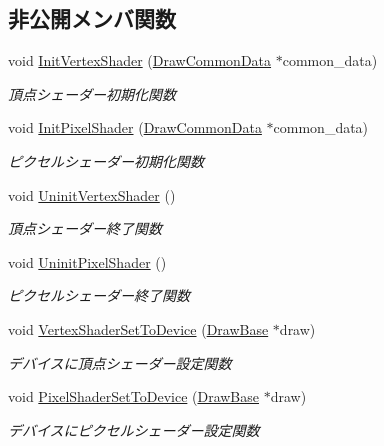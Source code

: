 \subsection*{非公開メンバ関数}
\begin{DoxyCompactItemize}
\item 
void \mbox{\hyperlink{class_shader_manager_a5bd660c22b7371684e2da37f0804b5ab}{Init\+Vertex\+Shader}} (\mbox{\hyperlink{class_draw_common_data}{Draw\+Common\+Data}} $\ast$common\+\_\+data)
\begin{DoxyCompactList}\small\item\em 頂点シェーダー初期化関数 \end{DoxyCompactList}\item 
void \mbox{\hyperlink{class_shader_manager_ada9ec9598240ca169bbcbd7231714e27}{Init\+Pixel\+Shader}} (\mbox{\hyperlink{class_draw_common_data}{Draw\+Common\+Data}} $\ast$common\+\_\+data)
\begin{DoxyCompactList}\small\item\em ピクセルシェーダー初期化関数 \end{DoxyCompactList}\item 
void \mbox{\hyperlink{class_shader_manager_adadfecd2a6e9b79dec633c79ed256e18}{Uninit\+Vertex\+Shader}} ()
\begin{DoxyCompactList}\small\item\em 頂点シェーダー終了関数 \end{DoxyCompactList}\item 
void \mbox{\hyperlink{class_shader_manager_ae672bb32f27d16fac548a507666facc9}{Uninit\+Pixel\+Shader}} ()
\begin{DoxyCompactList}\small\item\em ピクセルシェーダー終了関数 \end{DoxyCompactList}\item 
void \mbox{\hyperlink{class_shader_manager_a49ddde68576a7bbc3dd4411e2d0caef7}{Vertex\+Shader\+Set\+To\+Device}} (\mbox{\hyperlink{class_draw_base}{Draw\+Base}} $\ast$draw)
\begin{DoxyCompactList}\small\item\em デバイスに頂点シェーダー設定関数 \end{DoxyCompactList}\item 
void \mbox{\hyperlink{class_shader_manager_a0e58bb3a973eb2cf6aa01cafee045b11}{Pixel\+Shader\+Set\+To\+Device}} (\mbox{\hyperlink{class_draw_base}{Draw\+Base}} $\ast$draw)
\begin{DoxyCompactList}\small\item\em デバイスにピクセルシェーダー設定関数 \end{DoxyCompactList}\item 

\end{DoxyCompactItemize}
